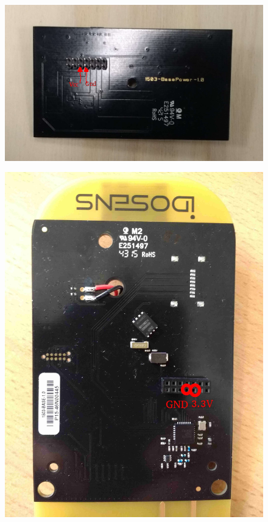 \documentclass{article}
\begin{document}
\begin{figure}[H]
\begin{center}
\advance\leftskip-3cm
\advance\rightskip-3cm
\includegraphics[keepaspectratio=true,scale=0.6]{power_dos_fleches.png}

\label{visina8}
\end{center}\end{figure}

\begin{figure}[H]
\begin{center}
\advance\leftskip-3cm
\advance\rightskip-3cm
\includegraphics[keepaspectratio=true,scale=0.1]{branchement_basepower2.jpg}

\label{visina8}
\end{center}\end{figure}
\end{document}
